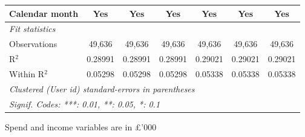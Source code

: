 \begin{table}[htbp]
\begin{threeparttable}[b]
\begin{tabular}{lcccccc}
         Calendar month            & Yes            & Yes            & Yes            & Yes            & Yes             & Yes\\  
         \midrule
         \emph{Fit statistics}\\
         Observations              & 49,636         & 49,636         & 49,636         & 49,636         & 49,636          & 49,636\\  
         R$^2$                     & 0.28991        & 0.28991        & 0.28991        & 0.29021        & 0.29021         & 0.29021\\  
         Within R$^2$              & 0.05298        & 0.05298        & 0.05298        & 0.05338        & 0.05338         & 0.05338\\  
         \midrule \midrule
         \multicolumn{7}{l}{\emph{Clustered (User id) standard-errors in parentheses}}\\
         \multicolumn{7}{l}{\emph{Signif. Codes: ***: 0.01, **: 0.05, *: 0.1}}\\
      \end{tabular}
      
      \begin{tablenotes}\footnotesize
         \item Spend and income variables are in £'000
      \end{tablenotes}
   \end{threeparttable}
\end{table}



